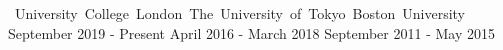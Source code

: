 %
%
%


\begin{cventries}

    {\vspace*{-0.45cm}\mbox{\hspace{18.5mm} University College London
        \hspace{4.5mm} The University of Tokyo \hspace{4.75mm} Boston University}}
    {}
    {}
    {\hspace{18.6mm} \small{September 2019 - Present}
        \hspace{17.4mm} \small{April 2016 - March 2018}
        \hspace{16.65mm} \small{September 2011 - May 2015}}

\vspace*{-0.2cm}
\end{cventries}
